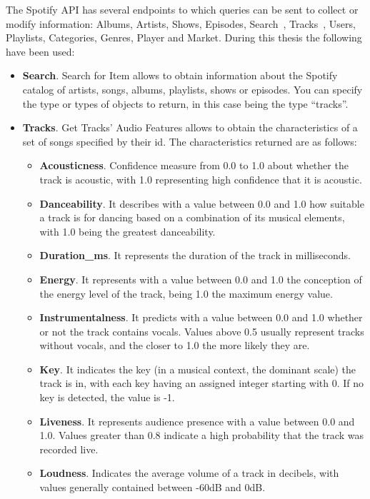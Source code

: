 \nonzeroparskip The Spotify API has several endpoints to which queries can be sent to collect or modify information: Albums, Artists, Shows, Episodes, Search~\cite{spotify_dev_endpoint_searchforitem}, Tracks~\cite{spotify_dev_endpoint_gettracksaudiofeatures}, Users, Playlists, Categories, Genres, Player and Market. During this thesis the following have been used:
\begin{itemize}
	\item \textbf{Search}. Search for Item allows to obtain information about the Spotify catalog of artists, songs, albums, playlists, shows or episodes. You can specify the type or types of objects to return, in this case being the type ``tracks''.
	\item \textbf{Tracks}. Get Tracks' Audio Features allows to obtain the characteristics of a set of songs specified by their id. The characteristics returned are as follows:
	\begin{itemize}
		\item \textbf{Acousticness}. Confidence measure from 0.0 to 1.0 about whether the track is acoustic, with 1.0 representing high confidence that it is acoustic.
		\item \textbf{Danceability}. It describes with a value between 0.0 and 1.0 how suitable a track is for dancing based on a combination of its musical elements, with 1.0 being the greatest danceability.
		\item \textbf{Duration\_ms}. It represents the duration of the track in milliseconds.
		\item \textbf{Energy}. It represents with a value between 0.0 and 1.0 the conception of the energy level of the track, being 1.0 the maximum energy value.
		\item \textbf{Instrumentalness}. It predicts with a value between 0.0 and 1.0 whether or not the track contains vocals. Values above 0.5 usually represent tracks without vocals, and the closer to 1.0 the more likely they are.
		\item \textbf{Key}. It indicates the key (in a musical context, the dominant scale) the track is in, with each key having an assigned integer starting with 0. If no key is detected, the value is -1.
		\item \textbf{Liveness}. It represents audience presence with a value between 0.0 and 1.0. Values greater than 0.8 indicate a high probability that the track was recorded live.
		\item \textbf{Loudness}. Indicates the average volume of a track in decibels, with values generally contained between -60dB and 0dB.

\end{itemize}
\end{itemize}
